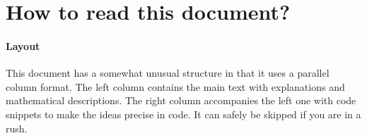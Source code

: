 \section*{How to read this document?}

\paragraph{Layout} This document has a somewhat unusual structure in that it uses a parallel column format.
The left column contains the main text with explanations and mathematical descriptions.
The right column accompanies the left one with code snippets to make the ideas precise in code.
It can safely be skipped if you are in a rush.

\begin{figure*}[!h]
  \centering
  
\end{figure*}

